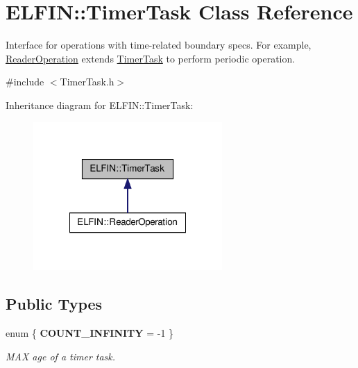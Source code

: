 \hypertarget{class_e_l_f_i_n_1_1_timer_task}{\section{E\-L\-F\-I\-N\-:\-:Timer\-Task Class Reference}
\label{class_e_l_f_i_n_1_1_timer_task}
}


Interface for operations with time-\/related boundary specs. For example, \hyperlink{class_e_l_f_i_n_1_1_reader_operation}{Reader\-Operation} extends \hyperlink{class_e_l_f_i_n_1_1_timer_task}{Timer\-Task} to perform periodic operation.  




{\ttfamily \#include $<$Timer\-Task.\-h$>$}



Inheritance diagram for E\-L\-F\-I\-N\-:\-:Timer\-Task\-:
\nopagebreak
\begin{figure}[H]
\begin{center}
\leavevmode
\includegraphics[width=204pt]{class_e_l_f_i_n_1_1_timer_task__inherit__graph}
\end{center}
\end{figure}
\subsection*{Public Types}
\begin{DoxyCompactItemize}
\item 
enum \{ {\bfseries C\-O\-U\-N\-T\-\_\-\-I\-N\-F\-I\-N\-I\-T\-Y} = -\/1
 \}
\begin{DoxyCompactList}\small\item\em M\-A\-X age of a timer task. \end{DoxyCompactList}\end{DoxyCompactItemize}
